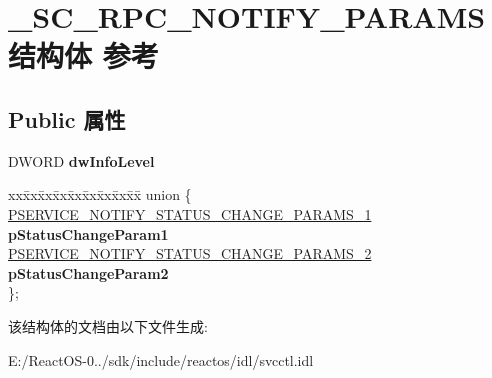 \hypertarget{struct___s_c___r_p_c___n_o_t_i_f_y___p_a_r_a_m_s}{}\section{\+\_\+\+S\+C\+\_\+\+R\+P\+C\+\_\+\+N\+O\+T\+I\+F\+Y\+\_\+\+P\+A\+R\+A\+M\+S结构体 参考}
\label{struct___s_c___r_p_c___n_o_t_i_f_y___p_a_r_a_m_s}
\subsection*{Public 属性}
\begin{DoxyCompactItemize}
\item 
\mbox{\label{struct___s_c___r_p_c___n_o_t_i_f_y___p_a_r_a_m_s_a8faa3b9d72c7ecd3e232eff7bc003cad}} 
D\+W\+O\+RD {\bfseries dw\+Info\+Level}
\item 
\mbox{\label{struct___s_c___r_p_c___n_o_t_i_f_y___p_a_r_a_m_s_a1b30897388b5ddd5e02db775efdde065}} 
\begin{tabbing}
xx\=xx\=xx\=xx\=xx\=xx\=xx\=xx\=xx\=\kill
union \{\\
\>\hyperlink{struct___s_e_r_v_i_c_e___n_o_t_i_f_y___s_t_a_t_u_s___c_h_a_n_g_e___p_a_r_a_m_s__1}{PSERVICE\_NOTIFY\_STATUS\_CHANGE\_PARAMS\_1} {\bfseries pStatusChangeParam1}\\
\>\hyperlink{struct___s_e_r_v_i_c_e___n_o_t_i_f_y___s_t_a_t_u_s___c_h_a_n_g_e___p_a_r_a_m_s__2}{PSERVICE\_NOTIFY\_STATUS\_CHANGE\_PARAMS\_2} {\bfseries pStatusChangeParam2}\\
\}; \\

\end{tabbing}\end{DoxyCompactItemize}


该结构体的文档由以下文件生成\+:\begin{DoxyCompactItemize}
\item 
E\+:/\+React\+O\+S-\/0../sdk/include/reactos/idl/svcctl.\+idl\end{DoxyCompactItemize}
